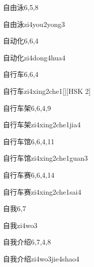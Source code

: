 \begin{entry}{自由泳}{6,5,8}
  \begin{phonetics}{自由泳}{zi4you2yong3}
  \end{phonetics}
\end{entry}

\begin{entry}{自动化}{6,6,4}
  \begin{phonetics}{自动化}{zi4dong4hua4}
  \end{phonetics}
\end{entry}

\begin{entry}{自行车}{6,6,4}
  \begin{phonetics}{自行车}{zi4xing2che1}[][HSK 2]
  \end{phonetics}
\end{entry}

\begin{entry}{自行车架}{6,6,4,9}
  \begin{phonetics}{自行车架}{zi4xing2che1jia4}
  \end{phonetics}
\end{entry}

\begin{entry}{自行车馆}{6,6,4,11}
  \begin{phonetics}{自行车馆}{zi4xing2che1guan3}
  \end{phonetics}
\end{entry}

\begin{entry}{自行车赛}{6,6,4,14}
  \begin{phonetics}{自行车赛}{zi4xing2che1sai4}
  \end{phonetics}
\end{entry}

\begin{entry}{自我}{6,7}
  \begin{phonetics}{自我}{zi4wo3}
  \end{phonetics}
\end{entry}

\begin{entry}{自我介绍}{6,7,4,8}
  \begin{phonetics}{自我介绍}{zi4wo3jie4shao4}
  \end{phonetics}
\end{entry}

